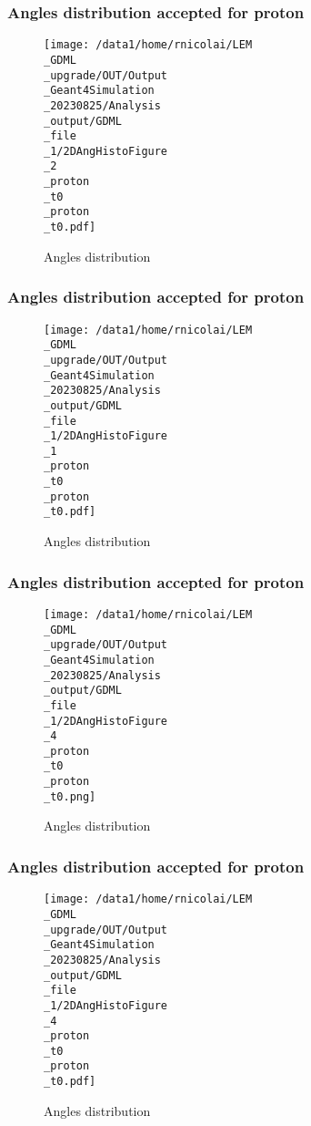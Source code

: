 \documentclass[8pt]{beamer}
\begin{document}
            \begin{frame}
                \frametitle{Angles distribution accepted for proton}
            
        \begin{figure}[h]
            \centering
            \texttt{[image: /data1/home/rnicolai/LEM\\\_GDML\\\_upgrade/OUT/Output\\\_Geant4Simulation\\\_20230825/Analysis\\\_output/GDML\\\_file\\\_1/2DAngHistoFigure\\\_2\\\_proton\\\_t0\\\_proton\\\_t0.pdf]}
            \caption{Angles distribution}
        \end{figure}
        
            \end{frame}
            
            \begin{frame}
                \frametitle{Angles distribution accepted for proton}
            
        \begin{figure}[h]
            \centering
            \texttt{[image: /data1/home/rnicolai/LEM\\\_GDML\\\_upgrade/OUT/Output\\\_Geant4Simulation\\\_20230825/Analysis\\\_output/GDML\\\_file\\\_1/2DAngHistoFigure\\\_1\\\_proton\\\_t0\\\_proton\\\_t0.pdf]}
            \caption{Angles distribution}
        \end{figure}
        
            \end{frame}
            
            \begin{frame}
                \frametitle{Angles distribution accepted for proton}
            
        \begin{figure}[h]
            \centering
            \texttt{[image: /data1/home/rnicolai/LEM\\\_GDML\\\_upgrade/OUT/Output\\\_Geant4Simulation\\\_20230825/Analysis\\\_output/GDML\\\_file\\\_1/2DAngHistoFigure\\\_4\\\_proton\\\_t0\\\_proton\\\_t0.png]}
            \caption{Angles distribution}
        \end{figure}
        
            \end{frame}
            
            \begin{frame}
                \frametitle{Angles distribution accepted for proton}
            
        \begin{figure}[h]
            \centering
            \texttt{[image: /data1/home/rnicolai/LEM\\\_GDML\\\_upgrade/OUT/Output\\\_Geant4Simulation\\\_20230825/Analysis\\\_output/GDML\\\_file\\\_1/2DAngHistoFigure\\\_4\\\_proton\\\_t0\\\_proton\\\_t0.pdf]}
            \caption{Angles distribution}
        \end{figure}
        
            \end{frame}
            
\end{document}
